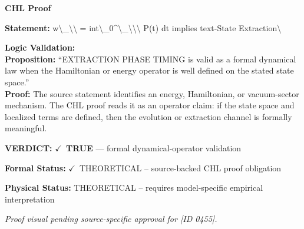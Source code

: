 \vspace{0.45em}
\noindent\textbf{CHL Proof}\par
\textbf{Statement:} w\textbackslash{}\_\textbackslash{}\textbackslash{} = int\textbackslash{}\_0\textasciicircum{}\textbackslash{}\_\textbackslash{}\textbackslash{}\textbackslash{} P(t) dt implies text-State Extraction\textbackslash{}

\textbf{Logic Validation:}\\
\textbf{Proposition:} ``EXTRACTION PHASE TIMING is valid as a formal dynamical law when the Hamiltonian or
energy operator is well defined on the stated state space.''\\
\textbf{Proof:} The source statement identifies an energy, Hamiltonian, or vacuum-sector mechanism. The
CHL proof reads it as an operator claim: if the state space and localized terms are
defined, then the evolution or extraction channel is formally meaningful.

\textbf{VERDICT:} \ensuremath{\checkmark}\ \textbf{TRUE} --- formal dynamical-operator validation

\textbf{Formal Status:} \ensuremath{\checkmark}\ THEORETICAL -- source-backed CHL proof obligation

\textbf{Physical Status:} THEORETICAL -- requires model-specific empirical interpretation
\par\vspace{0.45em}
\par
\vfill
\begingroup\footnotesize\itshape
Proof visual pending source-specific approval for [ID 0455].
\par\endgroup
\vfill
\endgroup
\endgroup
